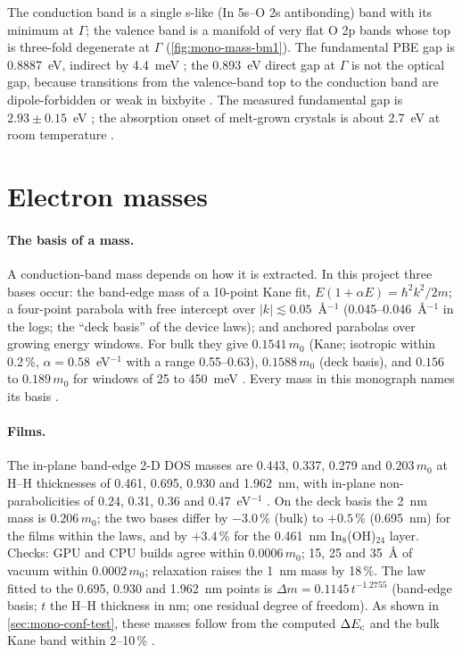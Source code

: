 The conduction band is a single s-like (In 5s--O 2s antibonding) band with its minimum at $\Gamma$; the valence band is
a manifold of very flat O 2p bands whose top is three-fold degenerate at $\Gamma$ (\cref{fig:mono-mass-bm1}). The
fundamental PBE gap is 0.8887~eV, indirect by 4.4~meV ; the 0.893~eV direct gap at $\Gamma$ is not the optical
gap, because transitions from the valence-band top to the conduction band are dipole-forbidden or weak in bixbyite
\citep{Walsh2008}. The measured fundamental gap is $2.93\pm0.15$~eV \citep{King2009}; the absorption onset of melt-grown
crystals is about 2.7~eV at room temperature \citep{Irmscher2014}.

\section{Electron masses}
\label{sec:mono-mass-electrons}

\paragraph{The basis of a mass.} A conduction-band mass depends on how it is extracted. In this project three bases
occur: the band-edge mass of a 10-point Kane fit, $E(1+\alpha E) = \hbar^2k^2/2m$; a four-point parabola with free
intercept over $|k|\lesssim0.05$~\AA$^{-1}$ (0.045--0.046~\AA$^{-1}$ in the logs; the ``deck basis'' of the device laws); and anchored parabolas over growing
energy windows. For bulk they give $0.1541\,m_0$ (Kane; isotropic within 0.2\,\%, $\alpha = 0.58$~eV$^{-1}$ with a range
0.55--0.63), $0.1588\,m_0$ (deck basis), and $0.156$ to $0.189\,m_0$ for windows of 25 to 450~meV 
 . Every mass in this monograph names its basis .

\paragraph{Films.} The in-plane band-edge 2-D DOS masses are 0.443, 0.337, 0.279 and $0.203\,m_0$ at H--H thicknesses
of 0.461, 0.695, 0.930 and 1.962~nm, with in-plane non-parabolicities of 0.24, 0.31, 0.36 and 0.47~eV$^{-1}$
. On the deck basis the 2~nm mass is $0.206\,m_0$; the two bases differ by $-3.0$\,\% (bulk) to $+0.5$\,\%
(0.695~nm) for the films within the laws, and by $+3.4$\,\% for the 0.461~nm In$_8$(OH)$_{24}$ layer. Checks: GPU and CPU builds agree within $0.0006\,m_0$; 15, 25 and 35~\AA{} of vacuum within $0.0002\,m_0$;
relaxation raises the 1~nm mass by 18\,\%. The law fitted to the 0.695, 0.930 and 1.962~nm points is $\Delta m =
0.1145\,t^{-1.2755}$ (band-edge basis; $t$ the H--H thickness in nm; one residual degree of freedom). As shown in
\cref{sec:mono-conf-test}, these masses follow from the computed $\Delta E_{\mathrm{c}}$ and the bulk Kane band within 2--10\,\%
.

